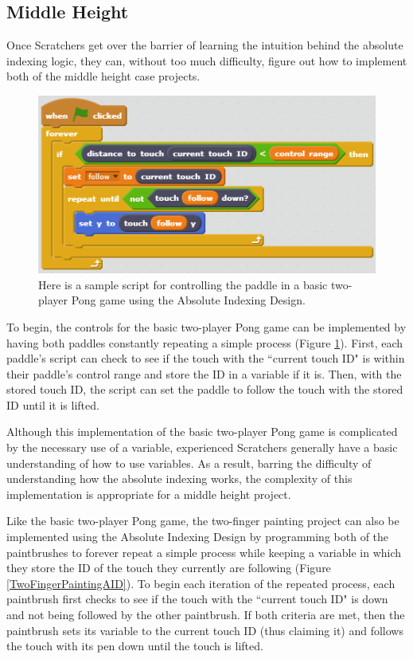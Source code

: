 \subsection{Middle Height}

Once Scratchers get over the barrier of learning the intuition behind the  absolute indexing logic, they can, without too much difficulty, figure out how to implement both of the middle height case projects.

\begin{figure}
\centering
\includegraphics{images/BasicTwoPlayerPongAID.PNG}
\caption[Sample Absolute Indexing Design Script for Basic Two-Player Pong]
{Here is a sample script for controlling the paddle in a basic two-player Pong game using the Absolute Indexing Design.}
\label{BasicTwoPlayerPongAID}
\end{figure}

To begin, the controls for the basic two-player Pong game can be implemented by having both paddles constantly repeating a simple process (Figure \ref{BasicTwoPlayerPongAID}). First, each paddle's script can check to see if the touch with the ``current touch ID" is within their paddle's control range and store the ID in a variable if it is. Then, with the stored touch ID, the script can set the paddle to follow the touch with the stored ID until it is lifted.

Although this implementation of the basic two-player Pong game is complicated by the necessary use of a variable, experienced Scratchers generally have a basic understanding of how to use variables. As a result, barring the difficulty of understanding how the absolute indexing works, the complexity of this implementation is appropriate for a middle height project.

Like the basic two-player Pong game, the two-finger painting project can also be implemented using the Absolute Indexing Design by programming both of the paintbrushes to forever repeat a simple process while keeping a variable in which they store the ID of the touch they currently are following (Figure \ref{TwoFingerPaintingAID}). To begin each iteration of the repeated process, each paintbrush first checks to see if the touch with the ``current touch ID" is down and not being followed by the other paintbrush. If both criteria are met, then the paintbrush sets its variable to the current touch ID (thus claiming it) and follows the touch with its pen down until the touch is lifted.

